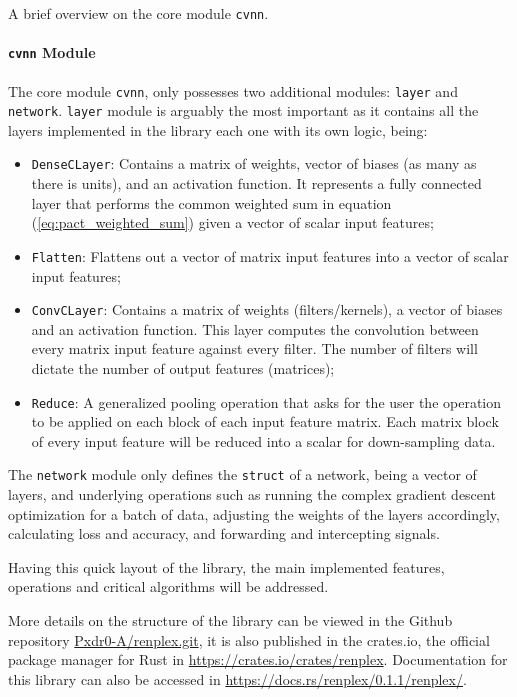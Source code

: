 A brief overview on the core module \texttt{cvnn}.

\paragraph{\texttt{cvnn} Module}
The core module \texttt{cvnn}, only possesses two additional modules: \texttt{layer} and \texttt{network}. \texttt{layer} module is arguably the most important as it contains all the layers implemented in the library each one with its own logic, being:

\begin{itemize}
	\item \texttt{DenseCLayer}: Contains a matrix of weights, vector of biases (as many as there is units), and an activation function. It represents a fully connected layer that performs the common weighted sum in equation (\ref{eq:pact_weighted_sum}) given a vector of scalar input features;
	\item \texttt{Flatten}: Flattens out a vector of matrix input features into a vector of scalar input features;
	\item \texttt{ConvCLayer}: Contains a matrix of weights (filters/kernels), a vector of biases and an activation function. This layer computes the convolution between every matrix input feature against every filter. The number of filters will dictate the number of output features (matrices);
	\item \texttt{Reduce}: A generalized pooling operation that asks for the user the operation to be applied on each block of each input feature matrix. Each matrix block of every input feature will be reduced into a scalar for down-sampling data.
\end{itemize}

The \texttt{network} module only defines the \texttt{struct} of a network, being a vector of layers, and underlying operations such as running the complex gradient descent optimization for a batch of data, adjusting the weights of the layers accordingly, calculating loss and accuracy, and forwarding and intercepting signals.

Having this quick layout of the library, the main implemented features, operations and critical algorithms will be addressed.

More details on the structure of the library can be viewed in the Github repository \href{https://github.com/Pxdr0-A/renplex.git}{Pxdr0-A/renplex.git}, it is also published in the crates.io, the official package manager for Rust in \href{https://crates.io/crates/renplex}{https://crates.io/crates/renplex}. Documentation for this library can also be accessed in \href{https://docs.rs/renplex/0.1.1/renplex/}{https://docs.rs/renplex/0.1.1/renplex/}.

